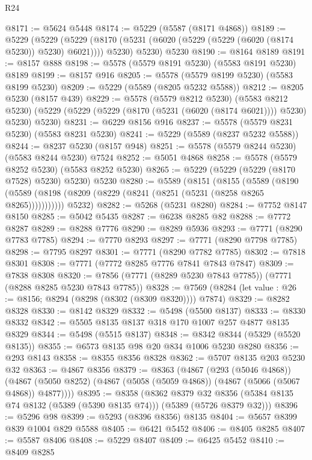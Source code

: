 \begin{lexlean}{R24}
\begin{coremodule}
@8171 := @5624 @5448
@8174 := @5229 (@5587 (@8171 @4868))
@8189 := @5229
    (@5229
      (@5229 (@8170 (@5231 (@6020 (@5229 (@5229 (@6020 (@8174 @5230)) @5230) @6021)))) @5230)
      @5230)
    @5230
@8190 := @8164 @8189
@8191 := @8157 @888
@8198 := @5578 (@5579 @8191 @5230) (@5583 @8191 @5230) @8189
@8199 := @8157 @916
@8205 := @5578 (@5579 @8199 @5230) (@5583 @8199 @5230)
@8209 := @5229 (@5589 (@8205 @5232 @5588))
@8212 := @8205 @5230 (@8157 @439)
@8229 := @5578
    (@5579 @8212 @5230)
    (@5583 @8212 @5230)
    (@5229 (@5229 (@5229 (@8170 (@5231 (@6020 (@8174 @6021)))) @5230) @5230) @5230)
@8231 := @6229 @8156 @916
@8237 := @5578 (@5579 @8231 @5230) (@5583 @8231 @5230)
@8241 := @5229 (@5589 (@8237 @5232 @5588))
@8244 := @8237 @5230 (@8157 @948)
@8251 := @5578 (@5579 @8244 @5230) (@5583 @8244 @5230) @7524
@8252 := @5051 @4868
@8258 := @5578 (@5579 @8252 @5230) (@5583 @8252 @5230)
@8265 := @5229 (@5229 (@5229 (@8170 @7528) @5230) @5230) @5230
@8280 := @5589
    (@8151
      (@8155
        (@5589 (@8190 (@5589 (@8198 (@8209 (@8229 (@8241 (@8251 (@5231 (@8258 @8265 @8265)))))))))))
      @5232)
@8282 := @5268 (@5231 @8280)
@8284 := @7752 @8147 @8150
@8285 := @5042 @5435
@8287 := @6238 @8285 @82
@8288 := @7772 @8287
@8289 := @8288 @7776
@8290 := @8289 @5936
@8293 := @7771 (@8290 @7783 @7785)
@8294 := @7770 @8293
@8297 := @7771 (@8290 @7798 @7785)
@8298 := @7795 @8297
@8301 := @7771 (@8290 @7782 @7785)
@8302 := @7818 @8301
@8308 := @7771 (@7772 @8285 @7776 @7841 @7843 @7847)
@8309 := @7838 @8308
@8320 := @7856 (@7771 (@8289 @5230 @7843 @7785)) (@7771 (@8288 @8285 @5230 @7843 @7785))
@8328 := @7569 (@8284 (let value : @26 := @8156; @8294 (@8298 (@8302 (@8309 @8320)))) @7874)
@8329 := @8282 @8328
@8330 := @8142 @8329
@8332 := @5498 (@5500 @8137)
@8333 := @8330 @8332
@8342 := @5505 @8135 @8137 @318 @170 @1007 @257 @4877 @8135 @8329
@8344 := @5498 (@5515 @8137)
@8348 := @8342 @8344 (@5329 (@5520 @8135))
@8355 := @6573 @8135 @98 @20 @834 @1006 @5230 @8280
@8356 := @293 @8143
@8358 := @8355 @8356 @8328
@8362 := @5707 @8135 @203 @5230 @32
@8363 := @4867 @8356
@8379 := @8363
    (@4867
      (@293 (@5046 @4868))
      (@4867 (@5050 @8252) (@4867 (@5058 (@5059 @4868)) (@4867 (@5066 (@5067 @4868)) @4877))))
@8395 := @8358
    (@8362
      @8379
      @32
      @8356
      (@5384 @8135 @74 @8132 (@5389 (@5390 @8135 @74)))
      (@5389 (@5726 @8379 @32)))
@8396 := @5296 @98
@8399 := @5293 (@8396 @8356) @8135
@8404 := @5657 @8399 @839 @1004 @829 @5588
@8405 := @6421 @5452
@8406 := @8405 @8285
@8407 := @5587 @8406
@8408 := @5229 @8407
@8409 := @6425 @5452
@8410 := @8409 @8285

\end{coremodule}
\end{lexlean}
